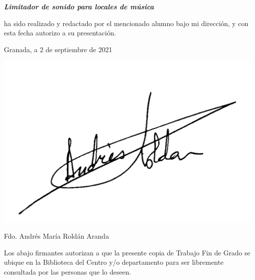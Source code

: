 \begin{doublespace}
\begin{center}
\textbf{\emph{\large {}Limitador de sonido para locales de música}}
\par\end{center}{\large \par}
\end{doublespace}

\noindent ha sido realizado y redactado por el mencionado alumno bajo
mi dirección, y con esta fecha autorizo a su presentación.

\vspace*{1cm}

\begin{center}
Granada, a 2 de septiembre de 2021
\par\end{center}

\bigskip
\bigskip
\begin{center}
\includegraphics[scale=0.2]{imagenes/firmaTutor.png}
\end{center}

\begin{center}
\begin{doublespace}
Fdo. Andrés María Roldán Aranda
\end{doublespace}
\end{center}

\newpage
\thispagestyle{empty}
\noindent

\newpage
{}
\noindent
\blankpage

\bigskip

\noindent Los abajo firmantes autorizan a que la presente copia de
Trabajo Fin de Grado se ubique en la Biblioteca del Centro y/o
departamento para ser libremente consultada por las personas que lo
deseen.

